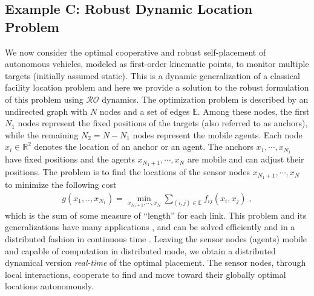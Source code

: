 \documentclass[journal,twoside,web]{ieeecolor}
\newcommand{\rev}[1]{\textcolor{revisionblue}{#1}}
\begin{document}
\subsection*{\rev{Example C: Robust Dynamic Location Problem}}
We now consider the optimal cooperative and robust self-placement of autonomous vehicles, modeled as first-order kinematic points, to monitor multiple targets (initially assumed static). This is a dynamic generalization of a classical facility location problem \cite{farahani2009} and here we provide a solution to the robust formulation of this problem using $\mathcal{RO}$ dynamics. The optimization problem is described by an undirected graph with $N$ nodes and a set of edges ${\mathbb E}$. Among these nodes, the first $N_1$ nodes represent the fixed positions of the targets (also referred to as anchors), while the remaining $N_2 = N - N_1$ nodes represent the mobile agents. Each node $x_i\in \mathbb{R}^2$ denotes the location of an anchor or an agent. The anchors $x_1,\cdots,x_{N_1}$ have fixed positions and the agents $x_{N_1+1},\cdots,x_{N}$ are mobile and can adjust their positions. The problem is to find the locations of the sensor nodes $x_{N_1+1},\cdots, x_N$ to minimize the following cost
\begin{align*}
g(x_1,..,x_{N_1})=\min_{x_{N_1+1},\cdots,x_N} \sum_{(i,j)\in {\mathbb E}}
f_{ij}(x_i, x_j)\;,
\end{align*}
which is the sum of some measure of ``length'' for each link. This problem and its generalizations have many applications \cite{boyd2004}, and can be solved efficiently and in a distributed fashion in continuous time \cite{wang2011}. Leaving the sensor nodes (agents) mobile and capable of computation in distributed mode, we obtain a distributed dynamical version \emph{real-time} of the optimal placement. The sensor nodes, through local interactions, cooperate to find and move toward their globally optimal locations autonomously.
\end{document}
